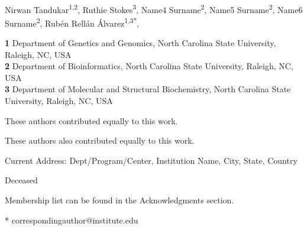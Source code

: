 \documentclass[10pt,letterpaper]{article}
\begin{document}
\vspace*{0.2in}

\begin{flushleft}
{\Large
\textbf{} %
}
\newline
\\
Nirwan Tandukar\textsuperscript{1,2\Yinyang},
Ruthie Stokes\textsuperscript{3},
Name4 Surname\textsuperscript{2},
Name5 Surname\textsuperscript{2\ddag},
Name6 Surname\textsuperscript{2\ddag},
Rubén Rellán Álvarez\textsuperscript{1,3*},

\bigskip
\textbf{1} Department of Genetics and Genomics, North Carolina State University, Raleigh, NC, USA
\\
\textbf{2} Department of Bioinformatics, North Carolina State University, Raleigh, NC, USA
\\
\textbf{3} Department of Molecular and Structural Biochemistry,  North Carolina State University, Raleigh, NC, USA
\\
\bigskip


% 
%
\Yinyang These authors contributed equally to this work.

\ddag These authors also contributed equally to this work.

\textcurrency Current Address: Dept/Program/Center, Institution Name, City, State, Country %

\dag Deceased

\textpilcrow Membership list can be found in the Acknowledgments section.

* correspondingauthor@institute.edu

\end{flushleft}
\end{document}
